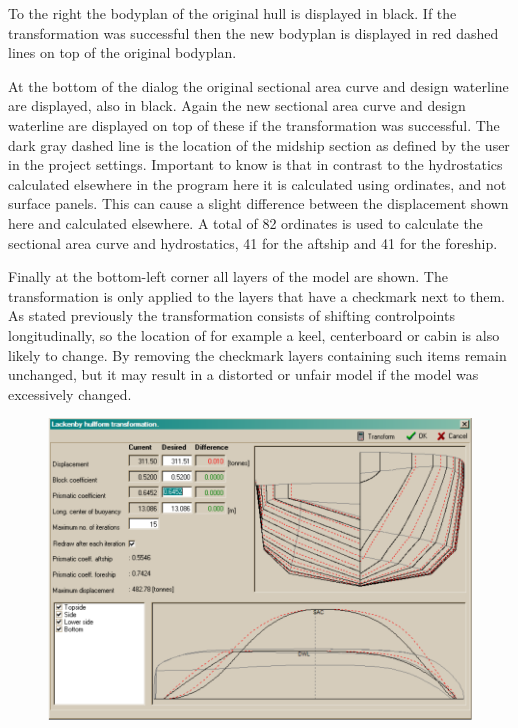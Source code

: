 \documentclass[12pt]{article}
\begin{document}
To the right the bodyplan of the original hull is displayed in
black. If the transformation was successful then the new bodyplan is
displayed in red dashed lines on top of the original bodyplan.

At the bottom of the dialog the original sectional area curve and
design waterline are displayed, also in black. Again the new sectional
area curve and design waterline are displayed on top of these if the
transformation was successful. The dark gray dashed line is the
location of the midship section as defined by the user in the project
settings. Important to know is that in contrast to the hydrostatics
calculated elsewhere in the program here it is calculated using
ordinates, and not surface panels. This can cause a slight difference
between the displacement shown here and calculated elsewhere. A total
of 82 ordinates is used to calculate the sectional area curve and
hydrostatics, 41 for the aftship and 41 for the foreship.

Finally at the bottom-left corner all layers of the model are
shown. The transformation is only applied to the layers that have a
checkmark next to them. As stated previously the transformation
consists of shifting controlpoints longitudinally, so the location of
for example a keel, centerboard or cabin is also likely to change. By
removing the checkmark layers containing such items remain unchanged,
but it may result in a distorted or unfair model if the model was
excessively changed.

\begin{figure}[h]
        \centering
        \includegraphics[width=15cm,natwidth=880,natheight=626]{lackenbydialog-2.png}
        \caption{}
        \label{fig:lackenby-2}
\end{figure}
\end{document}

